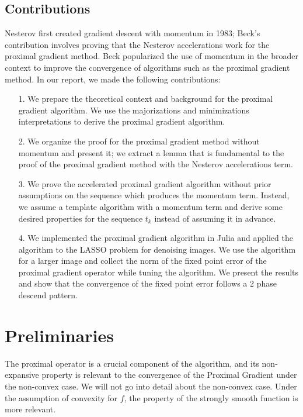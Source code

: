 \documentclass[]{article}
\theoremstyle{definition}
\begin{document}
    \subsection{Contributions}
        Nesterov first created gradient descent with momentum in 1983; Beck's contribution involves proving that the Nesterov accelerations work for the proximal gradient method. Beck popularized the use of momentum in the broader context to improve the convergence of algorithms such as the proximal gradient method. In our report, we made the following contributions: 
        \begin{itemize}
            \item [1.] We prepare the theoretical context and background for the proximal gradient algorithm. We use the majorizations and minimizations interpretations to derive the proximal gradient algorithm. 
            \item [2.] We organize the proof for the proximal gradient method without momentum and present it; we extract a lemma that is fundamental to the proof of the proximal gradient method with the Nesterov accelerations term. 
            \item [3.] We prove the accelerated proximal gradient algorithm without prior assumptions on the sequence which produces the momentum term. Instead, we assume a template algorithm with a momentum term and derive some desired properties for the sequence $t_k$ instead of assuming it in advance. 
            \item [4.] We implemented the proximal gradient algorithm in Julia and applied the algorithm to the LASSO problem for denoising images. We use the algorithm for a larger image and collect the norm of the fixed point error of the proximal gradient operator while tuning the algorithm. We present the results and show that the convergence of the fixed point error follows a 2 phase descend pattern.
        \end{itemize}

\section{Preliminaries}\label{sec:preliminaries}
    The proximal operator is a crucial component of the algorithm, and its non-expansive property is relevant to the convergence of the Proximal Gradient under the non-convex case. We will not go into detail about the non-convex case. Under the assumption of convexity for $f$, the property of the strongly smooth function is more relevant. 
\end{document}
